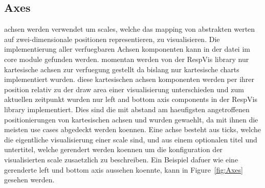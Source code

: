 \subsection{Axes}


achsen werden verwendet um scales, welche das mapping von abstrakten werten auf zwei-dimensionale positionen representieren, zu visualisieren.
Die implementierung aller verfuegbaren Achsen komponenten kann in der  datei im core module gefunden werden.
momentan werden von der RespVis library nur kartesische achsen zur verfuegung gestellt da bislang nur kartesische charts implementiert wurden.
diese kartesischen achsen komponenten werden per ihrer position relativ zu der draw area einer visualisierung unterschieden und zum aktuellen zeitpunkt wurden nur left and bottom axis components in der RespVis library implementiert.
Dies sind die mit abstand am haeufigsten angetroffenen positionierungen von kartesischen achsen und wurden gewaehlt, da mit ihnen die meisten use cases abgedeckt werden koennen. 
Eine achse besteht aus ticks, welche die eigentliche visualisierung einer scale sind, und aus einem optionalen titel und untertitel, welche gerendert werden koennen um die konfiguration der visualisierten scale zusaetzlich zu beschreiben. 
Ein Beispiel dafuer wie eine gerenderte left und bottom axis aussehen koennte, kann in Figure~\ref{fig:Axes} gesehen werden. 

